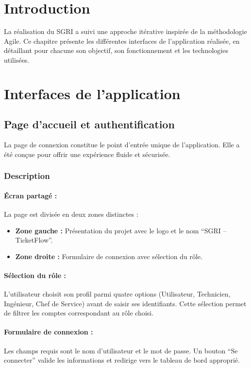 \documentclass[12pt,a4paper,oneside]{report}
\begin{document}
\section{Introduction}

La réalisation du SGRI a suivi une approche itérative inspirée de la méthodologie Agile. Ce chapitre présente les différentes interfaces de l'application réalisée, en détaillant pour chacune son objectif, son fonctionnement et les technologies utilisées.

\section{Interfaces de l'application}

\subsection{Page d'accueil et authentification}

La page de connexion constitue le point d'entrée unique de l'application. Elle a été conçue pour offrir une expérience fluide et sécurisée.

\subsubsection{Description}

\paragraph{Écran partagé :} La page est divisée en deux zones distinctes :
\begin{itemize}
    \item \textbf{Zone gauche :} Présentation du projet avec le logo et le nom ``SGRI -- TicketFlow''.
    \item \textbf{Zone droite :} Formulaire de connexion avec sélection du rôle.
\end{itemize}

\paragraph{Sélection du rôle :} L'utilisateur choisit son profil parmi quatre options (Utilisateur, Technicien, Ingénieur, Chef de Service) avant de saisir ses identifiants. Cette sélection permet de filtrer les comptes correspondant au rôle choisi.

\paragraph{Formulaire de connexion :} Les champs requis sont le nom d'utilisateur et le mot de passe. Un bouton ``Se connecter'' valide les informations et redirige vers le tableau de bord approprié.
\end{document}
